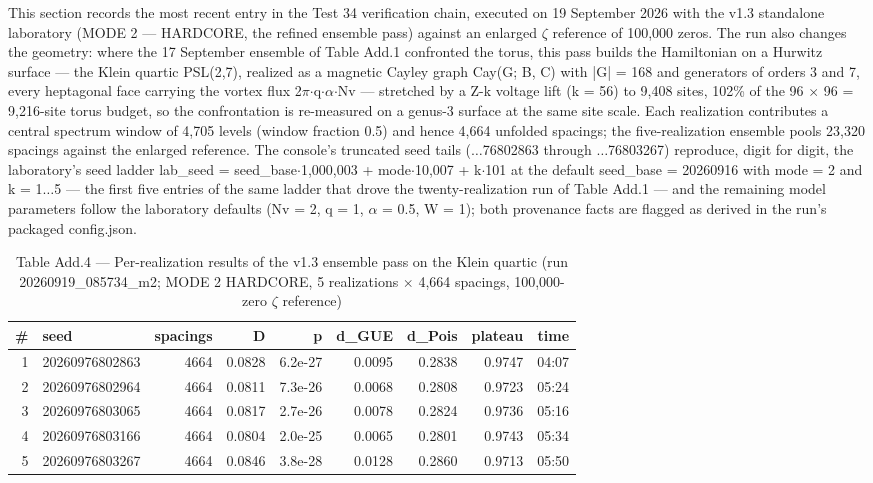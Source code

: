 \documentclass[10pt]{article}
\begin{document}
This section records the most recent entry in the Test 34 verification chain, executed on 19 September 2026 with the v1.3 standalone laboratory (MODE 2 --- HARDCORE, the refined ensemble pass) against an enlarged $\zeta$ reference of 100,000 zeros. The run also changes the geometry: where the 17 September ensemble of Table Add.1 confronted the torus, this pass builds the Hamiltonian on a Hurwitz surface --- the Klein quartic PSL(2,7), realized as a magnetic Cayley graph Cay(G; B, C) with |G| = 168 and generators of orders 3 and 7, every heptagonal face carrying the vortex flux 2$\pi$$\cdot$q$\cdot$$\alpha$$\cdot$Nv --- stretched by a Z-k voltage lift (k = 56) to 9,408 sites, 102\% of the 96 $\times$ 96 = 9,216-site torus budget, so the confrontation is re-measured on a genus-3 surface at the same site scale. Each realization contributes a central spectrum window of 4,705 levels (window fraction 0.5) and hence 4,664 unfolded spacings; the five-realization ensemble pools 23,320 spacings against the enlarged reference. The console’s truncated seed tails ($\ldots$76802863 through $\ldots$76803267) reproduce, digit for digit, the laboratory’s seed ladder lab\_seed = seed\_base$\cdot$1,000,003 + mode$\cdot$10,007 + k$\cdot$101 at the default seed\_base = 20260916 with mode = 2 and k = 1$\ldots$5 --- the first five entries of the same ladder that drove the twenty-realization run of Table Add.1 --- and the remaining model parameters follow the laboratory defaults (Nv = 2, q = 1, $\alpha$ = 0.5, W = 1); both provenance facts are flagged as derived in the run’s packaged config.json.


\begin{table}[tbp]\centering\small
\caption{Table Add.4 --- Per-realization results of the v1.3 ensemble pass on the Klein quartic (run 20260919\_085734\_m2; MODE 2 HARDCORE, 5 realizations $\times$ 4,664 spacings, 100,000-zero $\zeta$ reference)}
\begin{tabular}{rlrrrrrrr}
\toprule
\# & seed & spacings & D & p & d\_GUE & d\_Pois & plateau & time \\
\midrule
1 & 20260976802863 & 4664 & 0.0828 & 6.2e-27 & 0.0095 & 0.2838 & 0.9747 & 04:07 \\
2 & 20260976802964 & 4664 & 0.0811 & 7.3e-26 & 0.0068 & 0.2808 & 0.9723 & 05:24 \\
3 & 20260976803065 & 4664 & 0.0817 & 2.7e-26 & 0.0078 & 0.2824 & 0.9736 & 05:16 \\
4 & 20260976803166 & 4664 & 0.0804 & 2.0e-25 & 0.0065 & 0.2801 & 0.9743 & 05:34 \\
5 & 20260976803267 & 4664 & 0.0846 & 3.8e-28 & 0.0128 & 0.2860 & 0.9713 & 05:50 \\
\bottomrule
\end{tabular}
\end{table}
\end{document}
